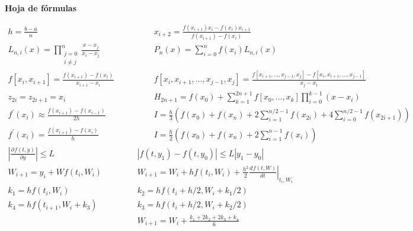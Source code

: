 \documentclass[12pt]{article}
\newcommand{\diff}[3]{\frac{d^{#3} #1}{d#2^{#3}}}
\newcommand{\pdiff}[3]{\frac{\partial^{#3} #1}{\partial #2^{#3}}}
\newcommand{\abs}[1]{\left| #1 \right|}
\begin{document}
\clearpage
\begin{center}
\textbf{Hoja de fórmulas}
\end{center}
{\large
\[
\begin{array}{cc}
h = \frac{b - a}{n} \qquad & \qquad
x_{i+2} = \frac{f(x_{i+1}){x_i}-f(x_{i}){x_{i+1}}}{f(x_{i+1}) - f(x_i)} \\
L_{n, i}(x) = \prod\limits_{\substack{j=0\\ i \neq j}}^n \frac{x - x_j}{x_i - x_j} \qquad & \qquad
P_n(x) = \sum\limits_{i = 0}^n f(x_i)L_{n,i}(x) \\
f\left[x_i, x_{i+1}\right] = \frac{f(x_{i+1})-f(x_i)}{x_{i+1}-x_i} \qquad & \qquad
f\left[ x_i, x_{i+1}, \ldots, x_{j-1}, x_j\right] = \frac{f\left[x_{i+1}, \ldots, x_{j-1}, x_j\right] - f\left[ x_i, x_{i+1}, \ldots, x_{j-1} \right]}{x_j - x_i} \\
z_{2i} = z_{2i+1} = x_i \qquad & \qquad
H_{2n+1} = f(x_0) + \sum\limits_{k=1}^{2n+1} f\left[x_0, \ldots, x_k\right] \prod\limits_{i = 0}^{k-1}(x-x_i)  \\
f^\prime(x_i) \approx \frac{f(x_{i+1}) - f(x_{i-1})}{2h} \qquad & \qquad
I = \frac{h}{3}\left( f(x_0) + f(x_n) + 2\sum\limits_{i=1}^{n/2-1}f(x_{2i}) + 4\sum\limits_{i=0}^{n/2-1}f(x_{2i+1}) \right) \\
f^\prime(x_i) = \frac{f(x_{i+1})-f(x_i)}{h} \qquad & \qquad
I = \frac{h}{2}\left( f(x_0) + f(x_n) + 2\sum\limits_{i = 1}^{n-1}f(x_i)\right) \\
\abs{\pdiff{f(t,y)}{y}{}} \leq L & \abs{f(t, y_1) -f(t, y_0)} \leq L\abs{y_1 - y_0}\\
W_{i+1} = y_i + W f(t_i,W_i) & W_{i+1} = W_i + h f(t_i,W_i) + \frac{h^2}{2} \left.\diff{f(t,W)}{t}{} \right|_{t_i, W_i} \\
k_1  =  h f(t_i,W_i) & k_2  =  h f(t_i+h/2,W_i + k_1/2) \\
k_4  =  h f(t_{i+1},W_i + k_3) & k_3  =  h f(t_i+h/2,W_i + k_2/2)\\
 & W_{i+1} = W_i + \frac{k_1+2k_2+2k_3+k_4}{6}
\end{array}
\]
}
\end{document}
